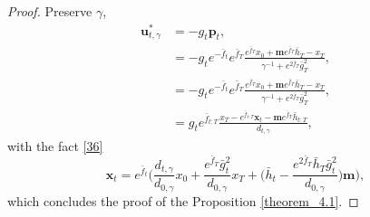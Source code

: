 \begin{proof}

Preserve $\gamma$, 
\begin{equation}
\begin{split}
\mathbf{u}^{*}_{t, \gamma} 
&= - g_t \mathbf{p}_{t}, \\
&= - g_t e^{-\bar{f}_{t}} e^{\bar{f}_{T}} \frac{e^{\bar{f}_{T}}x_0 + \mathbf{m} e^{\bar{f}_{T}} \bar{h}_{T} - x_{T}}{\gamma^{-1} + e^{2\bar{f}_{T}} \bar{g}^2_{T}}, \\
&= - g_t e^{-\bar{f}_{t}} e^{\bar{f}_{T}} \frac{e^{\bar{f}_{T}} x_0 + \mathbf{m} e^{\bar{f}_{T}} \bar{h}_{T} - x_{T}}{\gamma^{-1}+ e^{2\bar{f}_{T}} \bar{g}^2_{T}}, \\
&= g_t e^{\bar{f}_{t:T}} \frac{x_{T} - e^{\bar{f}_{t:T}} \mathbf{x}_t - \mathbf{m} e^{\bar{f}_{T}} \bar{h}_{t:T}}{d_{t, \gamma}},
\end{split}
\end{equation}
with the fact \eqref{36}
\begin{equation}
\mathbf{x}_t = e^{\bar{f}_{t}} \Bigg(\frac{d_{t, \gamma}}{d_{0, \gamma}} x_0 + \frac{e^{\bar{f}_{T}} \bar{g}^2_{t}}{d_{0, \gamma}} x_T + \Big(\bar{h}_{t} - \frac{e^{2\bar{f}_{T}} \bar{h}_{T} \bar{g}^2_{t}}{d_{0, \gamma}}\Big) \mathbf{m}\Bigg),
\end{equation}
which concludes the proof of the Proposition \ref{theorem_4.1}.
\end{proof}






